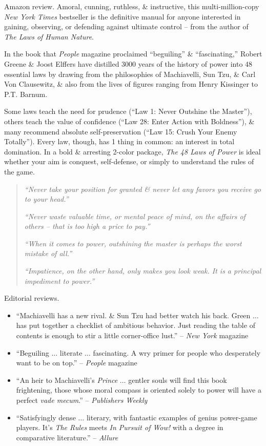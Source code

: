 \documentclass{article}
\begin{document}
\begin{enumerate}
	{\sf Amazon review.} Amoral, cunning, ruthless, \& instructive, this multi-million-copy {\it New York Times} bestseller is the definitive manual for anyone interested in gaining, observing, or defending against ultimate control -- from the author of {\it The Laws of Human Nature}.
	
	In the book that {\it People} magazine proclaimed ``beguiling'' \& ``fascinating,'' {\sc Robert Greene} \& {\sc Joost Elffers} have distilled 3000 years of the history of power into 48 essential laws by drawing from the philosophies of {\sc Machiavelli, Sun Tzu}, \& {\sc Carl Von Clausewitz}, \& also from the lives of figures ranging from {\sc Henry Kissinger} to {\sc P.T. Barnum}.
	
	Some laws teach the need for prudence (``Law 1: Never Outshine the Master''), others teach the value of confidence (``Law 28: Enter Action with Boldness''), \& many recommend absolute self-preservation (``Law 15: Crush Your Enemy Totally''). Every law, though, has 1 thing in common: an interest in total domination. In a bold \& arresting 2-color package, {\it The 48 Laws of Power} is ideal whether your aim is conquest, self-defense, or simply to understand the rules of the game.
	\begin{quotation}
		{\it``Never take your position for granted \& never let any favors you receive go to your head.''}
		
		{\it``Never waste valuable time, or mental peace of mind, on the affairs of others -- that is too high a price to pay.''}
		
		{\it``When it comes to power, outshining the master is perhaps the worst mistake of all.''}
		
		{\it``Impatience, on the other hand, only makes you look weak. It is a principal impediment to power.''}
	\end{quotation}
	{\sf Editorial reviews.}
	\begin{itemize}
		\item ``{\sc Machiavelli} has a new rival. \& {\sc Sun Tzu} had better watch his back. {\sc Green} $\ldots$ has put together a checklist of ambitious behavior. Just reading the table of contents is enough to stir a little corner-office lust.'' -- {\it New York} magazine
		\item ``Beguiling $\ldots$ literate $\ldots$ fascinating. A wry primer for people who desperately want to be on top.'' -- {\it People} magazine
		\item ``An heir to {\sc Machiavelli}'s {\it Prince} $\ldots$ gentler souls will find this book frightening, those whose moral compass is oriented solely to power will have a perfect {\it vade mecum}.'' -- {\it Publishers Weekly}
		\item ``Satisfyingly dense $\ldots$ literary, with fantastic examples of genius power-game players. It's {\it The Rules} meets {\it In Pursuit of Wow!} with a degree in comparative literature.'' -- {\it Allure}
	\end{itemize}
	

\end{enumerate}
\end{document}
